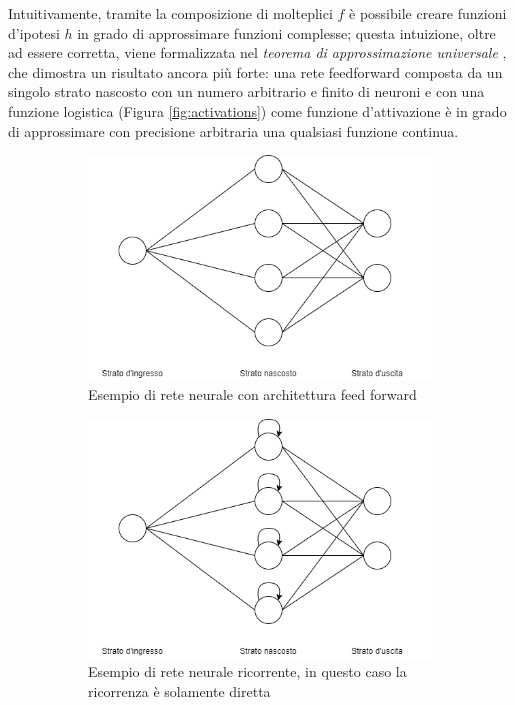 \documentclass[../../main.tex]{subfiles}
\begin{document}
Intuitivamente, tramite la composizione di molteplici $f$ è possibile creare funzioni d'ipotesi $h$ in grado di approssimare funzioni complesse; questa intuizione, oltre ad essere corretta, viene formalizzata nel \textit{teorema di approssimazione universale} \cite{journals/mcss/Cybenko89}, che dimostra un risultato ancora più forte: una rete feedforward composta da un singolo strato nascosto con un numero arbitrario e finito di neuroni e con una funzione logistica (Figura \ref{fig:activations}) come funzione d'attivazione è in grado di approssimare con precisione arbitraria una qualsiasi funzione continua.

\begin{figure}[H]
    \begin{subfigure}[]{0.48\textwidth}
        \centering
        \includegraphics[width = \textwidth]{immagini/4_2/feed_forward.png}
        \caption{Esempio di rete neurale con architettura feed forward}
        \label{fig:feedforward}        
    \end{subfigure}
    \begin{subfigure}[]{0.48\textwidth}
        \centering
        \includegraphics[width = \textwidth]{immagini/4_2/RNN.png}
        \caption{Esempio di rete neurale ricorrente, in questo caso la ricorrenza è solamente diretta}
        \label{fig:RNN}
    \end{subfigure}
    \caption{}
\end{figure}
\end{document}
